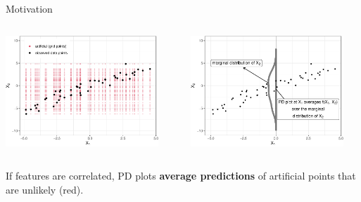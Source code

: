 \documentclass[11pt,compress,t,notes=noshow, aspectratio=169, xcolor=table]{beamer}
\begin{document}
\begin{frame}{Motivation}

\begin{columns}[T]
\begin{column}{0.5\textwidth}
\centering
\includegraphics[width=0.9\textwidth]{figure/ale_scatter_grid}
\end{column}
\begin{column}{0.5\textwidth}
\centering
\includegraphics[width=0.9\textwidth]{figure/ale_pdplot}
\end{column}
\end{columns}


If features are correlated, PD plots \textbf{average predictions} of artificial points that are unlikely (red).


\end{frame}
\end{document}
